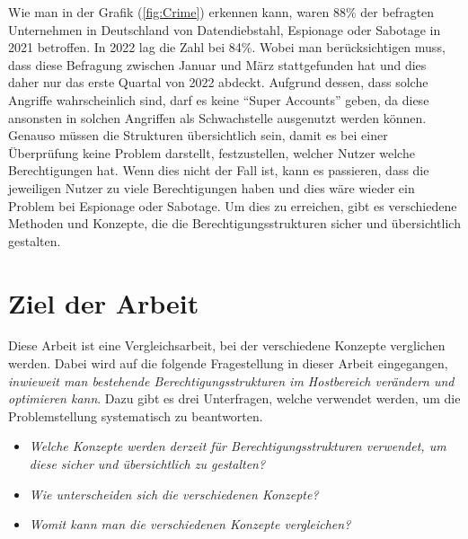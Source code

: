 Wie man in der Grafik (\ref{fig:Crime}) erkennen kann, waren 88\% der befragten Unternehmen in Deutschland von Datendiebstahl, Espionage oder Sabotage in 2021 betroffen.
In 2022 lag die Zahl bei 84\%.
Wobei man berücksichtigen muss, dass diese Befragung zwischen Januar und März stattgefunden hat und dies daher nur das erste Quartal von 2022 abdeckt.
Aufgrund dessen, dass solche Angriffe wahrscheinlich sind, darf es keine "`Super Accounts"' geben, da diese ansonsten in solchen Angriffen als Schwachstelle ausgenutzt werden können.
Genauso müssen die Strukturen übersichtlich sein, damit es bei einer Überprüfung keine Problem darstellt, festzustellen, welcher Nutzer welche Berechtigungen hat.
Wenn dies nicht der Fall ist, kann es passieren, dass die jeweiligen Nutzer zu viele Berechtigungen haben und dies wäre wieder ein Problem bei Espionage oder Sabotage.
Um dies zu erreichen, gibt es verschiedene Methoden und Konzepte, die die Berechtigungsstrukturen sicher und übersichtlich gestalten.

%
%
\section{Ziel der Arbeit}
\label{sec:intro:goal}
Diese Arbeit ist eine Vergleichsarbeit, bei der verschiedene Konzepte verglichen werden.
Dabei wird auf die folgende Fragestellung in dieser Arbeit eingegangen, \textit{inwieweit man bestehende Berechtigungsstrukturen im Hostbereich verändern und optimieren kann}.
Dazu gibt es drei Unterfragen, welche verwendet werden, um die Problemstellung systematisch zu beantworten.

\begin{itemize}
  \item \textit{Welche Konzepte werden derzeit für Berechtigungsstrukturen verwendet, um diese sicher und übersichtlich zu gestalten?}
  \item \textit{Wie unterscheiden sich die verschiedenen Konzepte?}
  \item \textit{Womit kann man die verschiedenen Konzepte vergleichen?}
\end{itemize}

